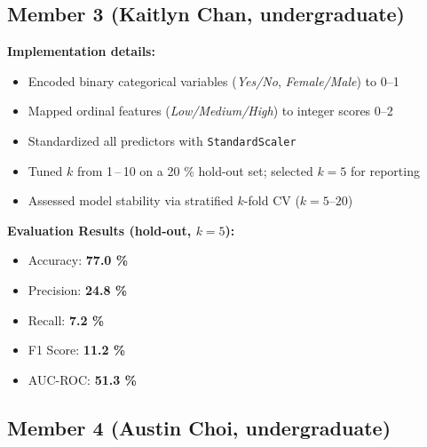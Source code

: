 \documentclass[11pt,a4paper]{article}
\begin{document}
\subsection{Member 3 (Kaitlyn Chan, undergraduate)}
\begin{tcolorbox}[%
        title=K-Nearest Neighbors Classification,
        colback=lightgreen!30,
        colframe=darkgreen,
        boxrule=0.5pt,
        fonttitle=\bfseries\sffamily\footnotesize,
        fontupper=\footnotesize
    ]
    \textbf{Implementation details:}
    \begin{itemize}[leftmargin=*, itemsep=2pt, parsep=0pt]
        \item Encoded binary categorical variables (\textit{Yes/No}, \textit{Female/Male}) to  \numrange{0}{1}
        \item Mapped ordinal features (\textit{Low/Medium/High}) to integer scores \numrange{0}{2}
        \item Standardized all predictors with \texttt{StandardScaler}
        \item Tuned $k$ from 1\,–\,10 on a 20 \% hold-out set; selected $k\!=\!5$ for reporting
        \item Assessed model stability via stratified $k$-fold CV ($k\!=\!5\text{–}20$)
    \end{itemize}

    \textbf{Evaluation Results (hold-out, $k=5$):}
    \begin{itemize}[leftmargin=*, itemsep=2pt, parsep=0pt]
        \item Accuracy: \textbf{77.0 \%}
        \item Precision: \textbf{24.8 \%}
        \item Recall: \textbf{7.2 \%}
        \item F1 Score: \textbf{11.2 \%}
        \item AUC-ROC: \textbf{51.3 \%}
    \end{itemize}
\end{tcolorbox}


\subsection{Member 4 (Austin Choi, undergraduate)}
\end{document}
